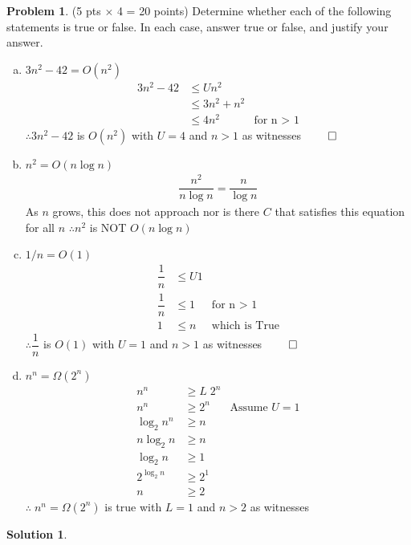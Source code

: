 \documentclass{article}
\theoremstyle{definition}
\newtheorem{problem}{Problem}
\newtheorem*{solution}{Solution}
\begin{document}
\begin{problem} (5 pts $\times$ 4 = 20 points) 
Determine whether each of the following statements is true or false.
In each case, answer true or false, and justify your answer.
\begin{enumerate}[a)]
\item $3n^2-42 = O(n^2)$
\begin{align*}
  3n^2-42 &\le U n^{2} \\
  &\le 3n^{2} + n^{2} \\
  &\le 4 n^{2} &\text{for n $>$ 1}
\end{align*}
$\therefore 3n^2-42$ is $O(n^{2})$ with $U = 4$ and $n > 1$ as witnesses $\qed$

\item $n^2 = O(n\log n)$
\begin{align*}
  \dfrac{n^2}{n\log n} = \dfrac{n}{\log n}
\end{align*}
As $n$ grows, this does not approach nor is there $C$ that satisfies this equation for all $n$
$\therefore n^2$ is NOT $O(n\log n)$

\item $1/n = O(1)$
\begin{align*}
  \dfrac{1}{n} &\le U 1 \\
  \dfrac{1}{n} &\le 1 &\text{for n $>$ 1} \\
  1 &\le n &\text{which is True}
\end{align*}
$\therefore \dfrac{1}{n}$ is $O(1)$ with $U = 1$ and $n > 1$ as witnesses $\qed$

\item $n^n = \Omega(2^n)$
\begin{align*}
	n^n &\ge L\; 2^n \\
    n^n &\ge 2^n	&\text{Assume $U=1$} \\
    \log_2{n^n} &\ge n \\
    n\log_2{n} &\ge n \\
    \log_2{n} &\ge 1 \\
    2^{\log_2{n}} &\ge 2^1 \\
    n &\ge 2
\end{align*}
$\therefore\; n^n = \Omega(2^n) $ is true with $L=1$ and $n >2$ as witnesses 
\end{enumerate}
\end{problem}
\begin{solution}
\end{solution}
\end{document}
